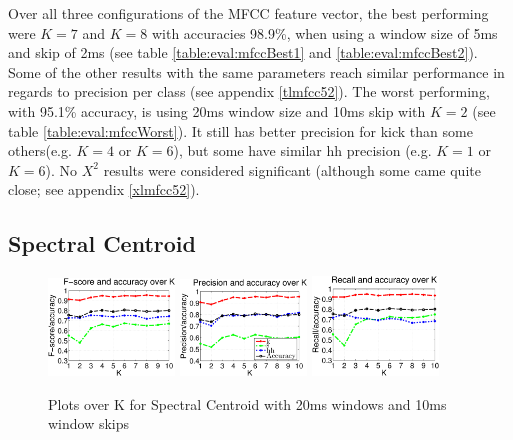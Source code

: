 		Over all three configurations of the MFCC feature vector, the best performing were $K=7$ and $K=8$ with accuracies 98.9\%, when using a window size of 5ms and skip of 2ms (see table \ref{table:eval:mfccBest1} and \ref{table:eval:mfccBest2}). Some of the other results with the same parameters reach similar performance in regards to precision per class (see appendix \ref{tlmfcc52}). The worst performing, with 95.1\% accuracy, is using 20ms window size and 10ms skip with $K=2$ (see table \ref{table:eval:mfccWorst}). It still has better precision for kick than some others(e.g. $K=4$ or $K=6$), but some have similar hh precision (e.g. $K=1$ or $K=6$). No $X^2$ results were considered significant (although some came quite close; see appendix \ref{xlmfcc52}).
		
	\subsection{Spectral Centroid}
		\begin{figure}
			\centering\includegraphics[width=0.3\textwidth]{tex/appendices/test/scentroid2010FP.png}
			\centering\includegraphics[width=0.3\textwidth]{tex/appendices/test/scentroid2010_P.png}
			\centering\includegraphics[width=0.3\textwidth]{tex/appendices/test/scentroid2010_R.png}
			
			\caption{Plots over K for Spectral Centroid with 20ms windows and 10ms window skips}
		\end{figure}
